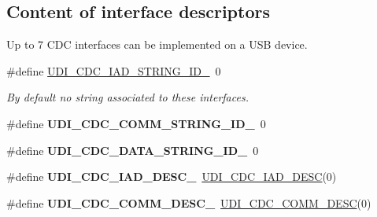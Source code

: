 \subsection*{Content of interface descriptors}
\label{_amgrp0af5cea1faee75023741e24af3471943}%
 Up to 7 C\-D\-C interfaces can be implemented on a U\-S\-B device. \begin{DoxyCompactItemize}
\item 
\hypertarget{group__udi__cdc__group__desc_gabc96016a68a85681606e867e38eeeafa}{\#define \hyperlink{group__udi__cdc__group__desc_gabc96016a68a85681606e867e38eeeafa}{U\-D\-I\-\_\-\-C\-D\-C\-\_\-\-I\-A\-D\-\_\-\-S\-T\-R\-I\-N\-G\-\_\-\-I\-D\-\_}~0}\label{group__udi__cdc__group__desc_gabc96016a68a85681606e867e38eeeafa}

\begin{DoxyCompactList}\small\item\em By default no string associated to these interfaces. \end{DoxyCompactList}\item 
\hypertarget{group__udi__cdc__group__desc_gaa1fc58df614cf24640648b8925b0962f}{\#define {\bfseries U\-D\-I\-\_\-\-C\-D\-C\-\_\-\-C\-O\-M\-M\-\_\-\-S\-T\-R\-I\-N\-G\-\_\-\-I\-D\-\_}~0}\label{group__udi__cdc__group__desc_gaa1fc58df614cf24640648b8925b0962f}

\item 
\hypertarget{group__udi__cdc__group__desc_ga1085569b1996a32c2f47b6b7f6988ecb}{\#define {\bfseries U\-D\-I\-\_\-\-C\-D\-C\-\_\-\-D\-A\-T\-A\-\_\-\-S\-T\-R\-I\-N\-G\-\_\-\-I\-D\-\_}~0}\label{group__udi__cdc__group__desc_ga1085569b1996a32c2f47b6b7f6988ecb}

\item 
\hypertarget{group__udi__cdc__group__desc_gacf03ff55fb2007268cb7619a0bfa1ef3}{\#define {\bfseries U\-D\-I\-\_\-\-C\-D\-C\-\_\-\-I\-A\-D\-\_\-\-D\-E\-S\-C\-\_}~\hyperlink{group__udi__cdc__group__desc_ga39928ecb0423aff5f7ab70ae98eb2c94}{U\-D\-I\-\_\-\-C\-D\-C\-\_\-\-I\-A\-D\-\_\-\-D\-E\-S\-C}(0)}\label{group__udi__cdc__group__desc_gacf03ff55fb2007268cb7619a0bfa1ef3}

\item 
\hypertarget{group__udi__cdc__group__desc_gad46649b8cf7b65cb75dbf3afd0ecd8c1}{\#define {\bfseries U\-D\-I\-\_\-\-C\-D\-C\-\_\-\-C\-O\-M\-M\-\_\-\-D\-E\-S\-C\-\_}~\hyperlink{group__udi__cdc__group__desc_gac76fc1207bccd36e9851945206c063c0}{U\-D\-I\-\_\-\-C\-D\-C\-\_\-\-C\-O\-M\-M\-\_\-\-D\-E\-S\-C}(0)}\label{group__udi__cdc__group__desc_gad46649b8cf7b65cb75dbf3afd0ecd8c1}


\end{DoxyCompactItemize}
